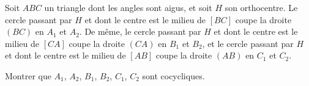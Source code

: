 Soit $ABC$ un triangle dont les angles sont aigus, et soit $H$ son orthocentre. Le cercle passant par $H$ et
dont le centre est le milieu de $[BC]$ coupe la droite $(BC)$ en $A_1$ et $A_2$. De même, le cercle passant par
$H$ et dont le centre est le milieu de $[CA]$ coupe la droite $(CA)$ en $B_1$ et $B_2$, et le cercle passant
par $H$ et dont le centre est le milieu de $[AB]$ coupe la droite $(AB)$ en $C_1$ et $C_2$.

Montrer que $A_1$, $A_2$, $B_1$, $B_2$, $C_1$, $C_2$ sont cocycliques.
